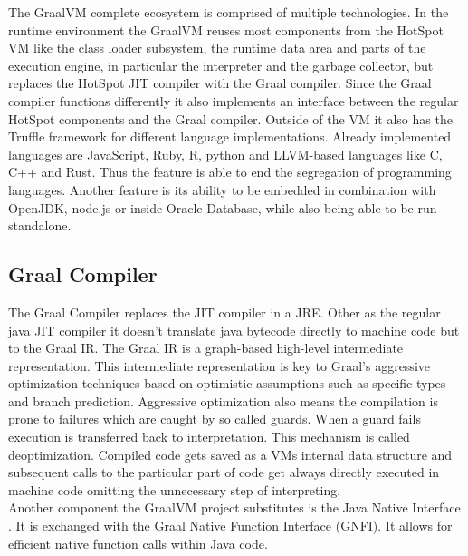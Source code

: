 The GraalVM complete ecosystem is comprised of multiple technologies. In the runtime environment the GraalVM reuses most components from the HotSpot VM like the class loader subsystem, the runtime data area and parts of the execution engine, in particular the interpreter and the garbage collector, but replaces the HotSpot JIT compiler with the Graal compiler. Since the Graal compiler functions differently it also implements an interface between the regular HotSpot components and the Graal compiler. Outside of the VM it also has the Truffle framework for different language implementations. Already implemented languages are JavaScript, Ruby, R, python and LLVM-based languages like C, C++ and Rust. Thus the feature is able to end the segregation of programming languages. Another feature is its ability to be embedded in combination with OpenJDK, node.js or inside Oracle Database, while also being able to be run standalone.
\subsection{Graal Compiler}\label{sec:graalcomp}
The Graal Compiler replaces the JIT compiler in a JRE. Other as the regular java JIT compiler it doesn't translate java bytecode directly to machine code but to the Graal IR. \cite{inproceedings} The Graal IR is a graph-based high-level intermediate representation. This intermediate representation is key to Graal's aggressive optimization techniques based on optimistic assumptions such as specific types and branch prediction. Aggressive optimization also means the compilation is prone to failures which are caught by so called guards. When a guard fails execution is transferred back to interpretation. This mechanism is called deoptimization. \cite{ChambDeopt} Compiled code gets saved as a VMs internal data structure and subsequent calls to the particular part of code get always directly executed in machine code omitting the unnecessary step of interpreting.\\
Another component the GraalVM project substitutes is the Java Native Interface \cite{Lindholm}. It is exchanged with the Graal Native Function Interface (GNFI). \cite{grimmerNative} It allows for efficient native function calls within Java code.
